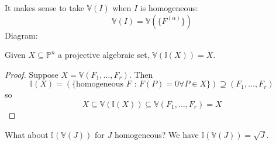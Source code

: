 \documentclass{report}
\begin{document}
It makes sense to take $\mathbb{V}(I)$ when $I$ is homogeneous:
    \begin{equation*}
        \mathbb{V}(I) = \mathbb{V}(\{F^{(\alpha)}\})
    \end{equation*}
Diagram:
    \begin{center}
    \end{center}

Given $X \subseteq \mathbb{P}^{n}$ a projective algebraic set, $\mathbb{V}(\mathbb{I}(X)) = X$.
    \begin{proof}
        Suppose $X = \mathbb{V}(F_{1}, \ldots, F_{r})$. Then 
            \begin{equation*}
                \mathbb{I}(X) = (\{\text{homogeneous $F$ : $F(P) = 0 \forall P \in X$}\}) \supseteq (F_{1}, \ldots, F_{r})
            \end{equation*}
        so
            \begin{equation*}
                X \subseteq \mathbb{V}(\mathbb{I}(X)) \subseteq \mathbb{V}(F_{1}, \ldots, F_{r}) = X
            \end{equation*}
    \end{proof}

What about $\mathbb{I}(\mathbb{V}(J))$ for $J$ homogeneous? We have $\mathbb{I}(\mathbb{V}(J)) = \sqrt{J}$.
\end{document}
